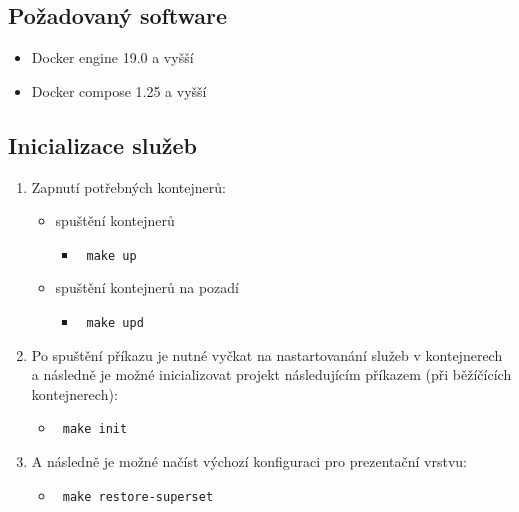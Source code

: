 \documentclass[10pt,a4paper,titlepage]{extarticle}
\begin{document}
    \subsection{Požadovaný software}\label{requirements}

    \begin{itemize}
        \itemsep1pt\parskip0pt
        \item Docker engine 19.0 a vyšší
        \item Docker compose 1.25 a vyšší
    \end{itemize}

    \subsection{Inicializace služeb}\label{initialization-of-services}

    \begin{enumerate}
        \def\labelenumi{\arabic{enumi}.}
        \itemsep1pt\parskip0pt
        \item Zapnutí potřebných kontejnerů:

        \begin{itemize}
            \itemsep1pt\parskip0pt

            \item spuštění kontejnerů

            \begin{itemize}
                \itemsep1pt\parskip0pt
                \item[] \texttt{\textdollar\ make up}
            \end{itemize}

            \item spuštění kontejnerů na pozadí

            \begin{itemize}
                \itemsep1pt\parskip0pt
                \item[] \texttt{\textdollar\ make upd}
            \end{itemize}
        \end{itemize}

        \item Po spuštění příkazu je nutné vyčkat na nastartovanání služeb v kontejnerech a následně je možné
        inicializovat projekt následujícím příkazem (při běžíčících kontejnerech):

        \begin{itemize}
            \itemsep1pt\parskip0pt
            \item[] \texttt{\textdollar\ make init}
        \end{itemize}

        \item A následně je možné načíst výchozí konfiguraci pro prezentační vrstvu:

        \begin{itemize}
            \itemsep1pt\parskip0pt
            \item[] \texttt{\textdollar\ make restore-superset}
        \end{itemize}
    \end{enumerate}
\end{document}
